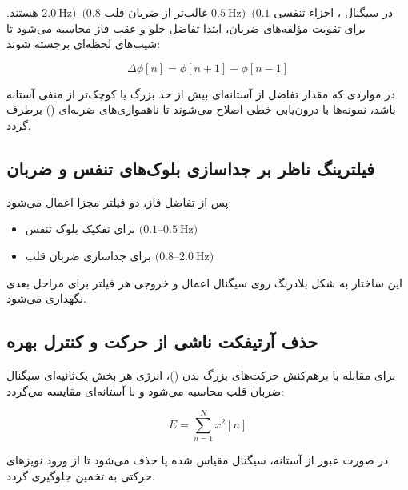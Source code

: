 در سیگنال ، اجزاء تنفسی $(0.1$–$0.5\ \mathrm{Hz})$ غالب‌تر از ضربان قلب $(0.8$–$2.0\ \mathrm{Hz})$ هستند. برای تقویت مؤلفه‌های ضربان، ابتدا تفاضل جلو و عقب فاز محاسبه می‌شود تا شیب‌های لحظه‌ای برجسته شوند:

\begin{equation}
\Delta \phi[n] = \phi[n+1] - \phi[n-1]
\label{eq:phase_diff}
\end{equation}

در مواردی که مقدار تفاضل از آستانه‌ای بیش از حد بزرگ یا کوچک‌تر از منفی آستانه باشد، نمونه‌ها با درون‌یابی خطی اصلاح می‌شوند تا ناهمواری‌های ضربه‌ای () برطرف گردد.

\subsection{فیلترینگ ناظر بر جداسازی بلوک‌های تنفس و ضربان}
\label{sec:bandpass-filtering}

پس از تفاضل فاز، دو فیلتر  مجزا اعمال می‌شود:

\begin{itemize}
  \item {} برای تفکیک بلوک تنفس $(0.1$–$0.5\ \mathrm{Hz})$
  \item {} برای جداسازی ضربان قلب $(0.8$–$2.0\ \mathrm{Hz})$
\end{itemize}

این ساختار به شکل بلادرنگ روی سیگنال اعمال و خروجی هر فیلتر برای مراحل بعدی نگهداری می‌شود.

\subsection{حذف آرتیفکت ناشی از حرکت و کنترل بهره}
\label{sec:motion-artifacts}

برای مقابله با برهم‌کنش حرکت‌های بزرگ بدن ()، انرژی هر بخش یک‌ثانیه‌ای سیگنال ضربان قلب محاسبه می‌شود و با آستانه‌ای مقایسه می‌گردد:

\begin{equation}
E = \sum_{n=1}^{N} x^2[n]
\label{eq:energy}
\end{equation}

در صورت عبور از آستانه، سیگنال مقیاس شده یا حذف می‌شود تا از ورود نویزهای حرکتی به تخمین جلوگیری گردد.

